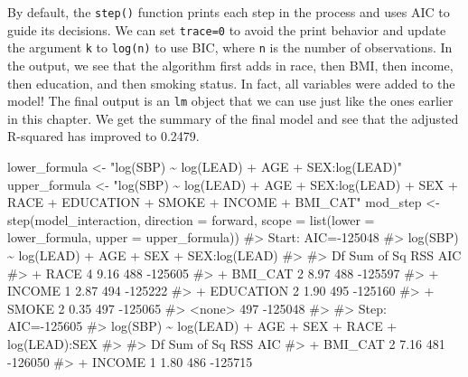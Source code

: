 \documentclass[
  letterpaper,
]{latex/krantz}
\makeatletter
\newenvironment{Shaded}{\begin{snugshade}}{\end{snugshade}}
\newcommand{\AttributeTok}[1]{\textcolor[rgb]{0.40,0.45,0.13}{#1}}
\newcommand{\CommentTok}[1]{\textcolor[rgb]{0.37,0.37,0.37}{#1}}
\newcommand{\FunctionTok}[1]{\textcolor[rgb]{0.28,0.35,0.67}{#1}}
\newcommand{\NormalTok}[1]{\textcolor[rgb]{0.00,0.23,0.31}{#1}}
\newcommand{\OtherTok}[1]{\textcolor[rgb]{0.00,0.23,0.31}{#1}}
\newcommand{\StringTok}[1]{\textcolor[rgb]{0.13,0.47,0.30}{#1}}
\newenvironment{kframe}{%
\medskip{}
\setlength{\fboxsep}{.8em}
 \def\at@end@of@kframe{}%
 \ifinner\ifhmode%
  \def\at@end@of@kframe{\end{minipage}}%
  \begin{minipage}{\columnwidth}%
 \fi\fi%
 \def\FrameCommand##1{\hskip\@totalleftmargin \hskip-\fboxsep
 \colorbox{shadecolor}{##1}\hskip-\fboxsep
     \hskip-\linewidth \hskip-\@totalleftmargin \hskip\columnwidth}%
 \MakeFramed {\advance\hsize-\width
   \@totalleftmargin\z@ \linewidth\hsize
   \@setminipage}}%
 {\par\unskip\endMakeFramed%
 \at@end@of@kframe}
\renewenvironment{Shaded}{\begin{kframe}}{\end{kframe}}
\makeatother
\begin{document}
By default, the \texttt{step()} function prints each step in the process
and uses AIC to guide its decisions. We can set \texttt{trace=0} to
avoid the print behavior and update the argument \texttt{k} to
\texttt{log(n)} to use BIC, where \texttt{n} is the number of
observations. In the output, we see that the algorithm first adds in
race, then BMI, then income, then education, and then smoking status. In
fact, all variables were added to the model! The final output is an
\texttt{lm} object that we can use just like the ones earlier in this
chapter. We get the summary of the final model and see that the adjusted
R-squared has improved to 0.2479.

\begin{Shaded}
\begin{Highlighting}[]
\NormalTok{lower\_formula }\OtherTok{\textless{}{-}} \StringTok{"log(SBP) \textasciitilde{} log(LEAD) + AGE + SEX:log(LEAD)"}
\NormalTok{upper\_formula }\OtherTok{\textless{}{-}} \StringTok{"log(SBP) \textasciitilde{} log(LEAD) + AGE + SEX:log(LEAD) + SEX + }
\StringTok{  RACE + EDUCATION + SMOKE + INCOME + BMI\_CAT"}
\NormalTok{mod\_step }\OtherTok{\textless{}{-}} \FunctionTok{step}\NormalTok{(model\_interaction, }\AttributeTok{direction =} \StringTok{\textquotesingle{}forward\textquotesingle{}}\NormalTok{, }
                 \AttributeTok{scope =} \FunctionTok{list}\NormalTok{(}\AttributeTok{lower =}\NormalTok{ lower\_formula, }
                              \AttributeTok{upper =}\NormalTok{ upper\_formula))}
\CommentTok{\#\textgreater{} Start:  AIC={-}125048}
\CommentTok{\#\textgreater{} log(SBP) \textasciitilde{} log(LEAD) + AGE + SEX + SEX:log(LEAD)}
\CommentTok{\#\textgreater{} }
\CommentTok{\#\textgreater{}             Df Sum of Sq RSS     AIC}
\CommentTok{\#\textgreater{} + RACE       4      9.16 488 {-}125605}
\CommentTok{\#\textgreater{} + BMI\_CAT    2      8.97 488 {-}125597}
\CommentTok{\#\textgreater{} + INCOME     1      2.87 494 {-}125222}
\CommentTok{\#\textgreater{} + EDUCATION  2      1.90 495 {-}125160}
\CommentTok{\#\textgreater{} + SMOKE      2      0.35 497 {-}125065}
\CommentTok{\#\textgreater{} \textless{}none\textgreater{}                   497 {-}125048}
\CommentTok{\#\textgreater{} }
\CommentTok{\#\textgreater{} Step:  AIC={-}125605}
\CommentTok{\#\textgreater{} log(SBP) \textasciitilde{} log(LEAD) + AGE + SEX + RACE + log(LEAD):SEX}
\CommentTok{\#\textgreater{} }
\CommentTok{\#\textgreater{}             Df Sum of Sq RSS     AIC}
\CommentTok{\#\textgreater{} + BMI\_CAT    2      7.16 481 {-}126050}
\CommentTok{\#\textgreater{} + INCOME     1      1.80 486 {-}125715}

\end{Highlighting}
\end{Shaded}
\end{document}
